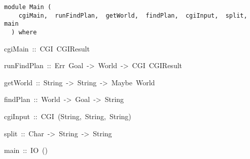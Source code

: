 \label{module:Main}
\haddockbeginheader
{\haddockverb\begin{verbatim}
module Main (
    cgiMain,  runFindPlan,  getWorld,  findPlan,  cgiInput,  split,  main
  ) where\end{verbatim}}
\haddockendheader

\begin{haddockdesc}
\item[
cgiMain\ ::\ CGI\ CGIResult
]
\item[
runFindPlan\ ::\ {\char 91}Err\ Goal{\char 93}\ ->\ World\ ->\ CGI\ CGIResult
]
\item[
getWorld\ ::\ String\ ->\ {\char 91}{\char 91}String{\char 93}{\char 93}\ ->\ Maybe\ World
]
\item[
findPlan\ ::\ World\ ->\ Goal\ ->\ {\char 91}String{\char 93}
]
\item[
cgiInput\ ::\ CGI\ (String,\ {\char 91}{\char 91}String{\char 93}{\char 93},\ String)
]
\item[
split\ ::\ Char\ ->\ String\ ->\ {\char 91}String{\char 93}
]
\item[
main\ ::\ IO\ ()
]
\end{haddockdesc}